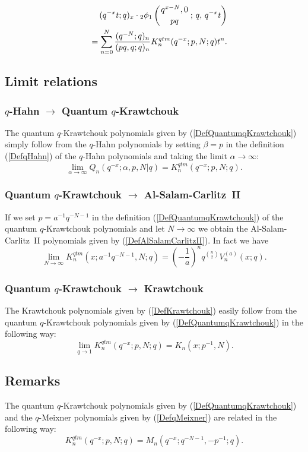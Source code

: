 \documentclass[envcountchap,graybox]{svmono}
\newcounter{rom}
\newcommand{\qhyp}[5]{\mbox{}_{#1}{\phi}_{#2}
\left(\genfrac{}{}{0pt}{}{#3}{#4}\,;\,q,\,#5\right)}
\newcommand{\qhyp}[5]{\,\mbox{}_{#1}\phi_{#2}\!\left(
  \genfrac{}{}{0pt}{}{#3}{#4};#5\right)}
\begin{document}
\begin{eqnarray}
\label{GenQuantumqKrawtchouk2}
& &(q^{-x}t;q)_x\cdot\qhyp{2}{1}{q^{x-N},0}{pq}{q^{-x}t}\nonumber\\
& &{}=\sum_{n=0}^N\frac{(q^{-N};q)_n}{(pq,q;q)_n}K_n^{qtm}(q^{-x};p,N;q)t^n.
\end{eqnarray}

\subsection*{Limit relations}

\subsubsection*{$q$-Hahn $\rightarrow$ Quantum $q$-Krawtchouk}
The quantum $q$-Krawtchouk polynomials given by (\ref{DefQuantumqKrawtchouk})
simply follow from the $q$-Hahn polynomials by setting $\beta=p$ in the definition (\ref{DefqHahn}) of
the $q$-Hahn polynomials and taking the limit $\alpha\rightarrow\infty$:
$$\lim_{\alpha\rightarrow\infty}Q_n(q^{-x};\alpha,p,N|q)=K_n^{qtm}(q^{-x};p,N;q).$$

\subsubsection*{Quantum $q$-Krawtchouk $\rightarrow$ Al-Salam-Carlitz~II}
If we set $p=a^{-1}q^{-N-1}$ in the definition (\ref{DefQuantumqKrawtchouk})
of the quantum $q$-Krawtchouk polynomials and let $N\rightarrow\infty$ we
obtain the Al-Salam-Carlitz~II polynomials given by
(\ref{DefAlSalamCarlitzII}). In fact we have
\begin{equation}
\lim_{N\rightarrow\infty}K_n^{qtm}(x;a^{-1}q^{-N-1},N;q)=
\left(-\frac{1}{a}\right)^nq^{\binom{n}{2}}V_n^{(a)}(x;q).
\end{equation}

\subsubsection*{Quantum $q$-Krawtchouk $\rightarrow$ Krawtchouk}
The Krawtchouk polynomials given by (\ref{DefKrawtchouk}) easily follow from
the quantum $q$-Krawtchouk polynomials given by (\ref{DefQuantumqKrawtchouk})
in the following way:
\begin{equation}
\lim_{q\rightarrow 1}K_n^{qtm}(q^{-x};p,N;q)=K_n(x;p^{-1},N).
\end{equation}

\subsection*{Remarks}
The quantum $q$-Krawtchouk polynomials given by
(\ref{DefQuantumqKrawtchouk}) and the $q$-Meixner polynomials given by
(\ref{DefqMeixner}) are related in the following way:
$$K_n^{qtm}(q^{-x};p,N;q)=M_n(q^{-x};q^{-N-1},-p^{-1};q).$$
\end{document}
